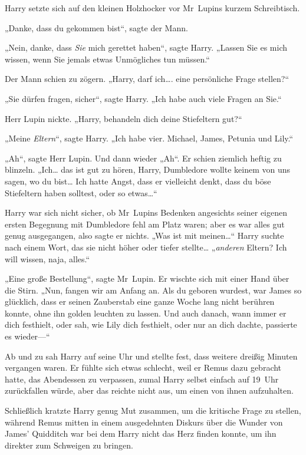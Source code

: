 {Harry setzte sich auf den kleinen Holzhocker vor Mr~Lupins kurzem Schreibtisch.

„Danke, dass du gekommen bist“, sagte der Mann.

„Nein, danke, dass \emph{Sie} mich gerettet haben“, sagte Harry. „Lassen Sie es mich wissen, wenn Sie jemals etwas Unmögliches tun müssen.“

Der Mann schien zu zögern. „Harry, darf ich…. eine persönliche Frage stellen?“

„Sie dürfen fragen, sicher“, sagte Harry. „Ich habe auch viele Fragen an Sie.“

Herr Lupin nickte. „Harry, behandeln dich deine Stiefeltern gut?“

„Meine \emph{Eltern}“, sagte Harry. „Ich habe vier. Michael, James, Petunia und Lily.“

„Ah“, sagte Herr Lupin. Und dann wieder „Ah“. Er schien ziemlich heftig zu blinzeln. „Ich… das ist gut zu hören, Harry, Dumbledore wollte keinem von uns sagen, wo du bist… Ich hatte Angst, dass er vielleicht denkt, dass du böse Stiefeltern haben solltest, oder so etwas…“

Harry war sich nicht sicher, ob Mr~Lupins Bedenken angesichts seiner eigenen ersten Begegnung mit Dumbledore fehl am Platz waren; aber es war alles gut genug ausgegangen, also sagte er nichts. „Was ist mit meinen…“ Harry suchte nach einem Wort, das sie nicht höher oder tiefer stellte… „\emph{anderen} Eltern? Ich will wissen, naja, alles.“

„Eine große Bestellung“, sagte Mr~Lupin. Er wischte sich mit einer Hand über die Stirn. „Nun, fangen wir am Anfang an. Als du geboren wurdest, war James so glücklich, dass er seinen Zauberstab eine ganze Woche lang nicht berühren konnte, ohne ihn golden leuchten zu lassen. Und auch danach, wann immer er dich festhielt, oder sah, wie Lily dich festhielt, oder nur an dich dachte, passierte es wieder—“

Ab und zu sah Harry auf seine Uhr und stellte fest, dass weitere dreißig Minuten vergangen waren. Er fühlte sich etwas schlecht, weil er Remus dazu gebracht hatte, das Abendessen zu verpassen, zumal Harry selbst einfach auf 19~Uhr zurückfallen würde, aber das reichte nicht aus, um einen von ihnen aufzuhalten.

Schließlich kratzte Harry genug Mut zusammen, um die kritische Frage zu stellen, während Remus mitten in einem ausgedehnten Diskurs über die Wunder von James' Quidditch war bei dem Harry nicht das Herz finden konnte, um ihn direkter zum Schweigen zu bringen.

}
